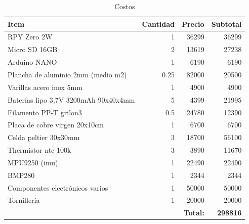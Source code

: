    \begin{table}[H]
     \centering
     \begin{tabular}{|l|r|r|r|}
     \hline
     \textbf{Item} & \textbf{Cantidad} & \textbf{Precio} & \textbf{Subtotal} \\
     \hline
     RPY Zero 2W                            & 1     & 36299  & 36299  \\
     Micro SD 16GB                          & 2     & 13619  & 27238  \\
     Arduino NANO                           & 1     & 6190   & 6190   \\
     Plancha de aluminio 2mm (medio m2)     & 0.25  & 82000  & 20500  \\
     Varillas acero inox 5mm                & 1     & 4900   & 4900   \\
     Baterías lipo 3,7V 3200mAh 90x40x4mm   & 5     & 4399   & 21995  \\
     Filamento PP-T grilon3                 & 0.5   & 24780  & 12390  \\
     Placa de cobre virgen 20x10cm          & 1     & 6700   & 6700   \\
     Celda peltier 30x30mm                  & 3     & 18700  & 56100  \\
     Thermistor ntc 100k                    & 3     & 3890   & 11670  \\
     MPU9250 (\acrshort{imu})               & 1     & 22490  & 22490  \\
     BMP280                                 & 1     & 2344   & 2344   \\
     Componentes electrónicos varios        & 1     & 50000  & 50000  \\
     Tornillería                            & 1     & 20000  & 20000  \\
     \hline
     \multicolumn{3}{|r|}{\textbf{Total:}} & \textbf{298816} \\
     \hline
     \end{tabular}
     \caption{Costos}
     \label{tab:costos}
   \end{table}
